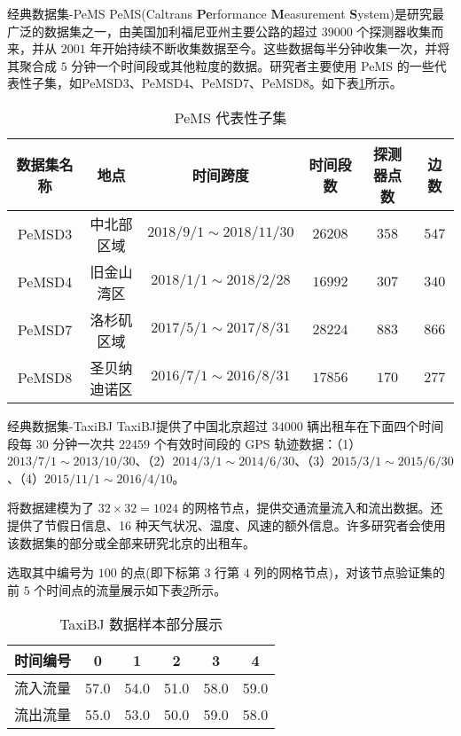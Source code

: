 \documentclass{libs/format}
\begin{document}
\begin{frame}{经典数据集-PeMS}
  PeMS(Caltrans \textbf{Pe}rformance \textbf{M}easurement \textbf{S}ystem)\cite{T-81}是研究最广泛的数据集之一，由美国加利福尼亚州主要公路的超过 $39000$ 个探测器收集而来，并从 $2001$ 年开始持续不断收集数据至今。这些数据每半分钟收集一次，并将其聚合成 $5$ 分钟一个时间段或其他粒度的数据。研究者主要使用 PeMS 的一些代表性子集，如PeMSD3、PeMSD4、PeMSD7、PeMSD8。如下表\ref{table:pems}所示。

  \setlength{\tabcolsep}{2pt}
  \begin{footnotesize}
  \begin{table}[]  
    \centering\caption{PeMS 代表性子集}\label{table:pems}
    \begin{tabular}{|c|c|c|c|c|c|}  
    \hline  
    数据集名称 & 地点 & 时间跨度 & 时间段数 & 探测器点数 & 边数 \\ \hline  
    PeMSD3 & 中北部区域 & $2018/9/1\sim2018/11/30$ & $26208$ & $358$ & $547$ \\ \hline  
    PeMSD4 & 旧金山湾区 & $2018/1/1\sim2018/2/28$ & $16992$ & $307$ & $340$ \\ \hline  
    PeMSD7 & 洛杉矶区域 & $2017/5/1\sim2017/8/31$ & $28224$ & $883$ & $866$ \\ \hline  
    PeMSD8 & 圣贝纳迪诺区 & $2016/7/1\sim2016/8/31$ & $17856$ & $170$ & $277$ \\ \hline  
    \end{tabular}  
  \end{table}
  \end{footnotesize}
  
\end{frame}

\begin{frame}{经典数据集-TaxiBJ}
  TaxiBJ\cite{T-51}提供了中国北京超过 $34000$ 辆出租车在下面四个时间段每 $30$ 分钟一次共 $22459$ 个有效时间段的 GPS 轨迹数据：（1）$2013/7/1\sim2013/10/30$、（2）$2014/3/1\sim2014/6/30$、（3）$2015/3/1\sim2015/6/30$、（4）$2015/11/1\sim2016/4/10$。
  
  将数据建模为了 $32\times32=1024$ 的网格节点，提供交通流量流入和流出数据。还提供了节假日信息、16 种天气状况、温度、风速的额外信息。许多研究者会使用该数据集的部分或全部来研究北京的出租车。

  选取其中编号为 $100$ 的点(即下标第 $3$ 行第 $4$ 列的网格节点)，对该节点验证集的前 $5$ 个时间点的流量展示如下表\ref{table:taxibj}所示。

  \begin{table}[]  
    \centering\caption{TaxiBJ 数据样本部分展示}\label{table:taxibj}
    \begin{tabular}{|c|c|c|c|c|c|}  
    \hline  
    时间编号 & 0 & 1 & 2 & 3 & 4 \\ \hline  
    流入流量 & 57.0 & 54.0 & 51.0 & 58.0 & 59.0 \\ \hline  
    流出流量 & 55.0 & 53.0 & 50.0 & 59.0 & 58.0 \\ \hline  
    \end{tabular}  
  \end{table}
\end{frame}
\end{document}
